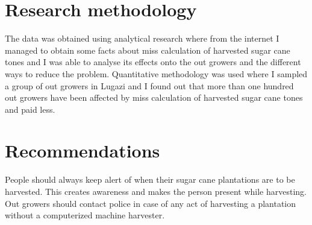 \documentclass[10pt,letterpaper]{article}
\begin{document}
\section{Research methodology}
The data was obtained using analytical research where from the internet I managed to obtain some facts about miss calculation of harvested sugar cane tones and I was able to analyse its effects onto the out growers and the different ways to reduce the problem.
Quantitative methodology was used where I sampled a group of out growers in Lugazi and I found out that more than one hundred out growers have been affected by miss calculation of harvested sugar cane tones and paid less.
\section{Recommendations}
People should always keep alert of when their sugar cane plantations are to be harvested. This creates awareness and makes the person present while harvesting.
Out growers should contact police in case of any act of harvesting a plantation without a computerized machine harvester.
\end{document}
